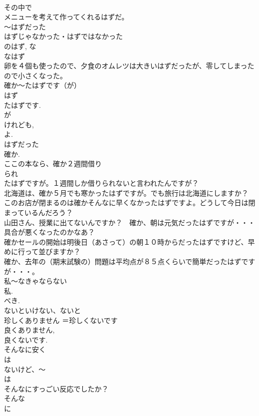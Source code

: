 \documentclass[8pt]{extreport}
\begin{document}
\begin{CJK}{UTF8}{min}
\\	その中で
\\	メニューを考えて作ってくれるはずだ。
\\	～はずだった
\\	はずじゃなかった・はずではなかった
\\	のはず, な
\\	なはず
\\	卵を４個も使ったので、夕食のオムレツは大きいはずだったが、零してしまったので小さくなった。
\\	確か～たはずです（が）
\\	はず 
\\	たはずです. 
\\	が 
\\	けれども, 
\\	よ. 
\\	はずだった 
\\	確か.
\\	ここの本なら、確か２週間借り
\\	られ
\\	たはずですが。１週間しか借りられないと言われたんですが？
\\	北海道は、確か５月でも寒かったはずですが。でも旅行は北海道にしますか？
\\	このお店が閉まるのは確かそんなに早くなかったはずですよ。どうして今日は閉まっているんだろう？　
\\	山田さん、授業に出てないんですか？　確か、朝は元気だったはずですが・・・　具合が悪くなったのかなあ？
\\	確かセールの開始は明後日（あさって）の朝１０時からだったはずですけど、早めに行って並びますか？
\\	確か、去年の（期末試験の）問題は平均点が８５点くらいで簡単だったはずですが・・・。
\\	私～なきゃならない
\\	私. 
\\	べき.
\\	ないといけない、ないと 
\\	珍しくありません	＝珍しくないです
\\	良くありません, 
\\	良くないです.
\\	そんなに安く
\\	は
\\	ないけど、～
\\	は 
\\	そんなにすっごい反応でしたか？
\\	そんな
\\	に 

\end{CJK}
\end{document}
